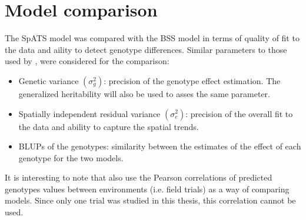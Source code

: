 \section{Model comparison}
The SpATS model was compared with the BSS model in terms of quality of fit to the data and aility to detect genotype differences. Similar parameters to those used by \textcite{velazco_modelling_2017}, were considered for the comparison:
\begin{itemize}
    \item Genetic variance $(\sigma_g^2)$: precision of the genotype effect estimation. The generalized heritability will also
    be used to asses the same parameter.
    \item Spatially independent residual variance $(\sigma_e^2)$: precision of the overall fit to the data and ability to 
    capture the spatial trends.
    \item BLUPs of the genotypes: similarity between the estimates of the effect of each genotype for the two models.
\end{itemize}
It is interesting to note that \textcite{rodriguez-alvarez_correcting_2018} also use the Pearson correlations of predicted genotypes values between environments (i.e. field trials) as a way of comparing models. Since only one trial was studied in this thesis, this correlation cannot be used.
